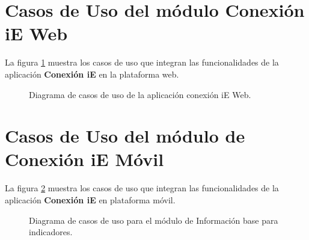 %
%
%
%
%


\section{Casos de Uso del módulo Conexión iE Web }

    La figura \ref{fig:casosUso:web} muestra los casos de uso que integran las funcionalidades de la aplicación \textbf{Conexión iE} en la plataforma web.
    \begin{figure}[h!]
	\begin{center}
	\caption{Diagrama de casos de uso de la aplicación conexión iE Web. \label{fig:casosUso:web}}
	\end{center}
    \end{figure}

\section{Casos de Uso del módulo de Conexión iE Móvil}
La figura \ref{fig:casosUso:movil} muestra los casos de uso que integran las funcionalidades de la aplicación \textbf{Conexión iE} en plataforma móvil.

 \begin{figure}[h!]
     \begin{center}
     \caption{Diagrama de casos de uso para el módulo de Información base para indicadores.}
     \label{fig:casosUso:movil}
     \end{center}
 \end{figure}

